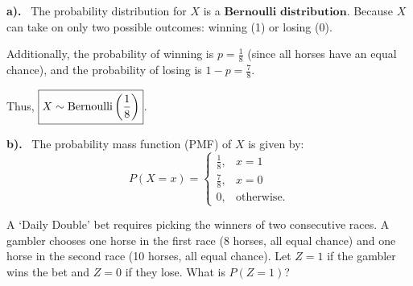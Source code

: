 \documentclass[a4paper, 10pt]{article}
\begin{document}
\begin{solution}
	\par\textbf{a).} \, The probability distribution for \( X \) is a \( \boxed{\textbf{Bernoulli distribution}} \).
	Because \( X \) can take on only two possible outcomes: winning (1) or losing (0).

	\myspace

	\par Additionally, the probability of winning is \( p = \frac{1}{8} \) (since all horses have an equal chance), and the probability of losing is \( 1 - p = \frac{7}{8} \).
	\par Thus, \( \boxed{ X \sim \text{Bernoulli}\left(\frac{1}{8}\right) } \).

	\myspace

	\par\textbf{b).} \, The probability mass function (PMF) of \( X \) is given by:
	\[\boxed{
			P(X = x) =
			\begin{cases}
				\frac{1}{8}, & x=1               \\
				\frac{7}{8}, & x=0               \\
				0,           & \text{otherwise.}
			\end{cases}
		}\]
\end{solution}

\begin{problem}
A `Daily Double' bet requires picking the winners of two consecutive races.
A gambler chooses one horse in the first race (8 horses, all equal chance) and
one horse in the second race (10 horses, all equal chance).
Let \( Z = 1 \) if the gambler wins the bet and \( Z = 0 \) if they lose. What is \( P(Z = 1) \)?
\end{problem}
\end{document}
